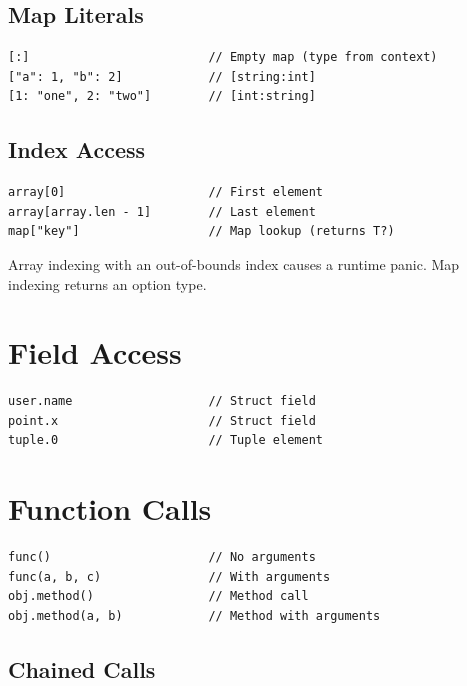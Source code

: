 \subsection{Map Literals}

\begin{lstlisting}
[:]                         // Empty map (type from context)
["a": 1, "b": 2]            // [string:int]
[1: "one", 2: "two"]        // [int:string]
\end{lstlisting}

\subsection{Index Access}

\begin{lstlisting}
array[0]                    // First element
array[array.len - 1]        // Last element
map["key"]                  // Map lookup (returns T?)
\end{lstlisting}

\begin{note}
Array indexing with an out-of-bounds index causes a runtime panic. Map indexing returns an option type.
\end{note}

\section{Field Access}

\begin{lstlisting}
user.name                   // Struct field
point.x                     // Struct field
tuple.0                     // Tuple element
\end{lstlisting}

\section{Function Calls}

\begin{lstlisting}
func()                      // No arguments
func(a, b, c)               // With arguments
obj.method()                // Method call
obj.method(a, b)            // Method with arguments
\end{lstlisting}

\subsection{Chained Calls}

